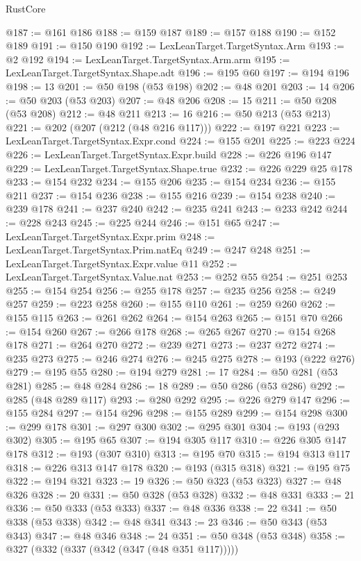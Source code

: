\begin{lexlean}{RustCore}
\begin{coremodule}
@187 := @161 @186
@188 := @159 @187
@189 := @157 @188
@190 := @152 @189
@191 := @150 @190
@192 := LexLeanTarget.TargetSyntax.Arm
@193 := @2 @192
@194 := LexLeanTarget.TargetSyntax.Arm.arm
@195 := LexLeanTarget.TargetSyntax.Shape.adt
@196 := @195 @60
@197 := @194 @196
@198 := 13
@201 := @50 @198 (@53 @198)
@202 := @48 @201
@203 := 14
@206 := @50 @203 (@53 @203)
@207 := @48 @206
@208 := 15
@211 := @50 @208 (@53 @208)
@212 := @48 @211
@213 := 16
@216 := @50 @213 (@53 @213)
@221 := @202 (@207 (@212 (@48 @216 @117)))
@222 := @197 @221
@223 := LexLeanTarget.TargetSyntax.Expr.cond
@224 := @155 @201
@225 := @223 @224
@226 := LexLeanTarget.TargetSyntax.Expr.build
@228 := @226 @196 @147
@229 := LexLeanTarget.TargetSyntax.Shape.true
@232 := @226 @229 @25 @178
@233 := @154 @232
@234 := @155 @206
@235 := @154 @234
@236 := @155 @211
@237 := @154 @236
@238 := @155 @216
@239 := @154 @238
@240 := @239 @178
@241 := @237 @240
@242 := @235 @241
@243 := @233 @242
@244 := @228 @243
@245 := @225 @244
@246 := @151 @65
@247 := LexLeanTarget.TargetSyntax.Expr.prim
@248 := LexLeanTarget.TargetSyntax.Prim.natEq
@249 := @247 @248
@251 := LexLeanTarget.TargetSyntax.Expr.value @11
@252 := LexLeanTarget.TargetSyntax.Value.nat
@253 := @252 @55
@254 := @251 @253
@255 := @154 @254
@256 := @255 @178
@257 := @235 @256
@258 := @249 @257
@259 := @223 @258
@260 := @155 @110
@261 := @259 @260
@262 := @155 @115
@263 := @261 @262
@264 := @154 @263
@265 := @151 @70
@266 := @154 @260
@267 := @266 @178
@268 := @265 @267
@270 := @154 @268 @178
@271 := @264 @270
@272 := @239 @271
@273 := @237 @272
@274 := @235 @273
@275 := @246 @274
@276 := @245 @275
@278 := @193 (@222 @276)
@279 := @195 @55
@280 := @194 @279
@281 := 17
@284 := @50 @281 (@53 @281)
@285 := @48 @284
@286 := 18
@289 := @50 @286 (@53 @286)
@292 := @285 (@48 @289 @117)
@293 := @280 @292
@295 := @226 @279 @147
@296 := @155 @284
@297 := @154 @296
@298 := @155 @289
@299 := @154 @298
@300 := @299 @178
@301 := @297 @300
@302 := @295 @301
@304 := @193 (@293 @302)
@305 := @195 @65
@307 := @194 @305 @117
@310 := @226 @305 @147 @178
@312 := @193 (@307 @310)
@313 := @195 @70
@315 := @194 @313 @117
@318 := @226 @313 @147 @178
@320 := @193 (@315 @318)
@321 := @195 @75
@322 := @194 @321
@323 := 19
@326 := @50 @323 (@53 @323)
@327 := @48 @326
@328 := 20
@331 := @50 @328 (@53 @328)
@332 := @48 @331
@333 := 21
@336 := @50 @333 (@53 @333)
@337 := @48 @336
@338 := 22
@341 := @50 @338 (@53 @338)
@342 := @48 @341
@343 := 23
@346 := @50 @343 (@53 @343)
@347 := @48 @346
@348 := 24
@351 := @50 @348 (@53 @348)
@358 := @327 (@332 (@337 (@342 (@347 (@48 @351 @117)))))

\end{coremodule}
\end{lexlean}
